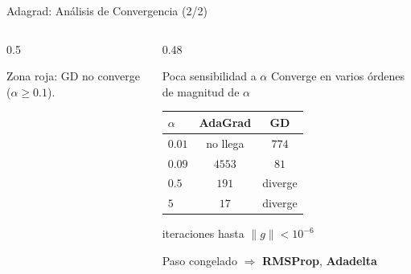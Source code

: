 \begin{frame}{Adagrad: Análisis de Convergencia (2/2)}
\begin{columns}[T]
\begin{column}{0.5\textwidth}
            {\tiny Zona roja: GD no converge ($\alpha\ge0.1$).\par}
        \end{column}
        \begin{column}{0.48\textwidth}
            \begin{alertblock}{Poca sensibilidad a $\alpha$}
                \footnotesize
                Converge en varios órdenes de magnitud de $\alpha$
            \end{alertblock}
            \centering
            \small
            \begin{tabular}{l c c}
                \toprule
                $\alpha$ & AdaGrad & GD \\
                \midrule
                $0.01$ & no llega & $774$ \\
                $0.09$ & $4553$ & $81$ \\
                $0.5$ & $191$ & diverge \\
                $5$ & $17$ & diverge \\
                \bottomrule
            \end{tabular}\par
            {\tiny iteraciones hasta $\lVert g\rVert<10^{-6}$\par}
            \raggedright
            \vspace{0.5em}
            {\small Paso congelado $\Rightarrow$ \textbf{RMSProp}, \textbf{Adadelta}\par}
        \end{column}
    \end{columns}
\end{frame}

